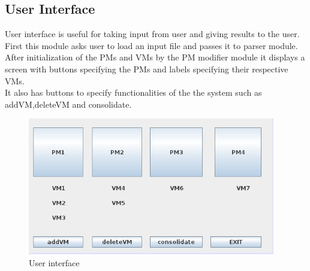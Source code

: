 \documentclass[a4paper,11pt]{article}
\begin{document}
\subsection{User Interface}
User interface is useful for taking input from  user and giving results to the user. First this module asks user to load an 
input file and passes it to parser module. After initialization of the PMs and VMs by the PM modifier module it displays a 
screen with buttons specifying the PMs and labels specifying their respective VMs.\\
It also has buttons to specify functionalities of the the system such as addVM,deleteVM and consolidate. 
\begin{figure}[h]
\centering
\includegraphics[height=6cm]{images/3.png}
\caption{User interface}
\end{figure}
\end{document}
